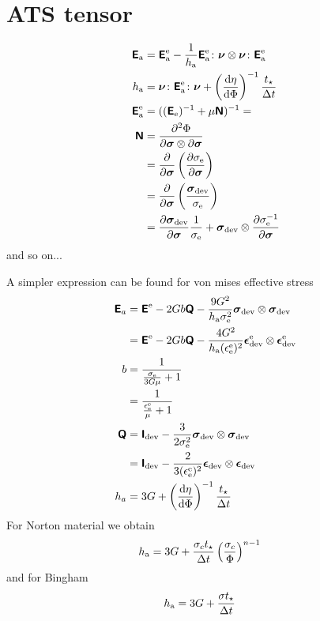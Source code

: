 \documentclass[a4paper,11pt]{article}
\newcommand{\tf}[1]{\text{\boldmath $\sf #1$}}
\newcommand{\ts}[1]{\text{\boldmath $#1$}}
\newcommand{\pderiv}[2]{\frac{\partial #1}{\partial #2}}
\newcommand{\dderiv}[2]{\frac{\mathrm{d} #1}{\mathrm{d} #2}}
\newcommand{\dev}{{\rm dev}}
\newcommand{\rme}{{\rm e}}
\newcommand{\ATS}{\tf{E}_{\rm a}}
\begin{document}
\section{ATS tensor}

\begin{align}
 \ATS &= \ATS^\rme - \frac{1}{h_{\rm a}}\ATS^\rme\colon\ts\nu\otimes\ts\nu\colon\ATS^\rme\\
 h_{\rm a} &= \ts \nu \colon \ATS^\rme \colon \ts \nu + \left(\dderiv{\eta}{\Phi}\right)^{-1} \frac{t_\star}{\Delta t}\\
 \ATS^\rme &= ((\tf E_\rme)^{-1}+\mu\tf N)^{-1} = \\
 \tf N &= \frac{\partial^2\Phi}{\partial\ts\sigma\otimes\partial\ts\sigma}\\
       &= \pderiv{}{\ts\sigma} \left(\pderiv{\sigma_\rme}{\ts\sigma}\right)\\
       &= \pderiv{}{\ts\sigma} \left(\frac{\ts\sigma_\dev}{\sigma_\rme}\right)\\
       &= \pderiv{\ts\sigma_\dev}{\ts\sigma} \frac{1}{\sigma_\rme} + \ts\sigma_\dev\otimes\pderiv{\sigma_\rme^{-1}}{\ts\sigma}
\end{align}
and so on...

A simpler expression can be found for von mises effective stress
\begin{align}
 \tf E_a &= \tf E^\rme - 2 G b \tf Q - \frac{9G^2}{h_{\rm a} \sigma_\rme^2}\ts\sigma_\dev\otimes\ts\sigma_\dev\\
 		 &= \tf E^\rme - 2 G b \tf Q - \frac{4G^2}{h_{\rm a} (\epsilon^\rme_\rme)^2}\ts\epsilon^\rme_\dev \otimes \ts\epsilon^\rme_\dev\\
 b &= \frac{1}{\frac{\sigma_\rme}{3G\mu}+1}\\
   &= \frac{1}{\frac{\epsilon_\rme^\rme}{\mu}+1}\\
 \tf Q &= \tf I_\dev - \frac{3}{2\sigma_\rme^2}\ts\sigma_\dev\otimes\ts\sigma_\dev\\
 	   &= \tf I_\dev - \frac{2}{3(\epsilon_\rme^\rme)^2}\ts\epsilon_\dev\otimes\ts\epsilon_\dev\\
 h_a &= 3 G + \left(\dderiv{\eta}{\Phi}\right)^{-1}\frac{t_\star}{\Delta t}
\end{align}
For Norton material we obtain
\begin{align}
	h_{\rm a} &= 3 G + \frac{\sigma_c t_\star}{\Delta t}\left(\frac{\sigma_c}{\Phi}\right)^{n-1}
\end{align}
and for Bingham
\begin{align}
	h_{\rm a} &= 3 G + \frac{\sigma t_\star}{\Delta t}
\end{align}
\end{document}
